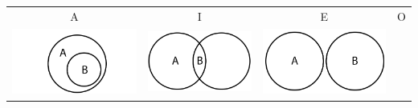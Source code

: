 \documentclass[12pt,a4paper]{report}
\begin{document}
\begin{table}[h!]
  \centering
  \begin{tabular}{  c  c  c  c }
    A & I & E & O\\
    \begin{minipage}{.22\textwidth}
      \includegraphics[width=\linewidth]{AEuler}
    \end{minipage}
    &
    \begin{minipage}{.22\textwidth}
      \includegraphics[width=\linewidth]{IEuler}
    \end{minipage}
    & 
    \begin{minipage}{.22\textwidth}
      \includegraphics[width=\linewidth]{EEuler}

\end{minipage}
\end{tabular}
\end{table}
\end{document}
